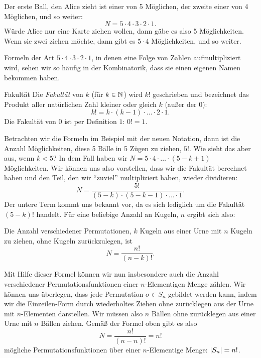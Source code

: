 \documentclass[../../main.tex]{subfiles}
\begin{document}
\begin{example}{}
        Der erste Ball, den Alice zieht ist einer von 5 Möglichen, der zweite einer von 4 Möglichen, und so weiter:
        \[N = 5\cdot 4 \cdot 3 \cdot 2 \cdot 1.\]
        Würde Alice nur eine Karte ziehen wollen, dann gäbe es also 5 Möglichkeiten. Wenn sie zwei ziehen möchte, dann gibt es $5\cdot 4$ Möglichkeiten, und so weiter.
    \end{example}
    
    Formeln der Art $5\cdot 4\cdot 3\cdot 2\cdot 1$, in denen eine Folge von Zahlen aufmultipliziert wird, sehen wir so häufig in der Kombinatorik, dass sie einen eigenen Namen bekommen haben.
    
    \begin{definition}{Fakultät}
        Die \emph{Fakultät} von $k$ (für $k\in\mathbb{N}$) wird $k!$ geschrieben und bezeichnet das Produkt aller natürlichen Zahl kleiner oder gleich $k$ (außer der 0):
        \[k! = k\cdot (k-1) \cdot \ldots \cdot 2 \cdot 1.\]
        Die Fakultät von $0$ ist per Definition $1$: $0! = 1$.
    \end{definition}
    
    Betrachten wir die Formeln im Beispiel mit der neuen Notation, dann ist die Anzahl Möglichkeiten, diese 5 Bälle in 5 Zügen zu ziehen, $5!$. Wie sieht das aber aus, wenn $k < 5$? In dem Fall haben wir $N = 5\cdot 4 \cdot \ldots \cdot (5-k+1)$ Möglichkeiten. Wir können uns also vorstellen, dass wir die Fakultät berechnet haben und den Teil, den wir \enquote{zuviel} multipliziert haben, wieder dividieren:
    \[N = \frac{5!}{(5-k) \cdot (5-k-1) \cdot \ldots \cdot 1}.\]
    Der untere Term kommt uns bekannt vor, da es sich lediglich um die Fakultät $(5-k)!$ handelt. Für eine beliebige Anzahl an Kugeln, $n$ ergibt sich also:
    \begin{lemma}{}
        Die Anzahl verschiedener Permutationen, $k$ Kugeln aus einer Urne mit $n$ Kugeln zu ziehen, ohne Kugeln zurückzulegen, ist
        \[N = \frac{n!}{(n-k)!}.\]
    \end{lemma}
    
    Mit Hilfe dieser Formel können wir nun insbesondere auch die Anzahl verschiedener Permutationsfunktionen einer $n$-Elementigen Menge zählen. Wir können uns überlegen, dass jede Permutation $\sigma \in S_n$ gebildet werden kann, indem wir die Einzeilen-Form durch wiederholtes Ziehen ohne zurücklegen aus der Urne mit $n$-Elementen darstellen. Wir müssen also $n$ Bällen ohne zurücklegen aus einer Urne mit $n$ Bällen ziehen. Gemäß der Formel oben gibt es also
    \[N = \frac{n!}{(n-n)!} = n!\]
    mögliche Permutationsfunktionen über einer $n$-Elementige Menge: $\lvert S_n\rvert = n!$.
    
\end{document}
